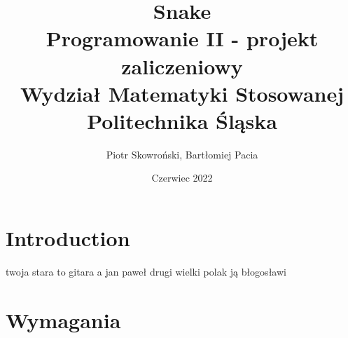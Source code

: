 \documentclass[12pt]{article}
\title{%
    Snake \\
    \large Programowanie II - projekt zaliczeniowy \\
    Wydział Matematyki Stosowanej \\
    Politechnika Śląska \\}
\author{Piotr Skowroński, Bartłomiej Pacia}
\date{Czerwiec 2022}
\begin{document}
\maketitle

\section{Introduction}

twoja stara to gitara a jan paweł drugi wielki polak ją błogosławi

\section{Wymagania}
\end{document}

